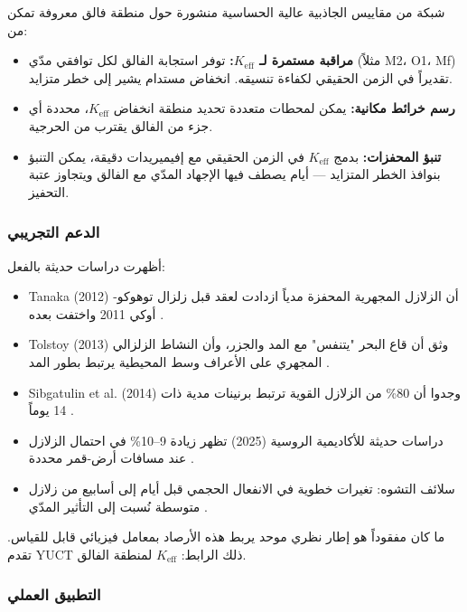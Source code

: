 \documentclass[12pt,a4paper]{article}
\theoremstyle{remark}
\begin{document}
	شبكة من مقاييس الجاذبية عالية الحساسية منشورة حول منطقة فالق معروفة تمكن من:
	
	\begin{itemize}
		\item \textbf{مراقبة مستمرة لـ \(K_{\mathrm{eff}}\):} توفر استجابة الفالق لكل توافقي مدّي (مثلاً M2، O1، Mf) تقديراً في الزمن الحقيقي لكفاءة تنسيقه. انخفاض مستدام يشير إلى خطر متزايد.
		\item \textbf{رسم خرائط مكانية:} يمكن لمحطات متعددة تحديد منطقة انخفاض \(K_{\mathrm{eff}}\)، محددة أي جزء من الفالق يقترب من الحرجية.
		\item \textbf{تنبؤ المحفزات:} بدمج \(K_{\mathrm{eff}}\) في الزمن الحقيقي مع إفيميريدات دقيقة، يمكن التنبؤ بنوافذ الخطر المتزايد — أيام يصطف فيها الإجهاد المدّي مع الفالق ويتجاوز عتبة التحفيز.
	\end{itemize}
	
	\subsubsection{الدعم التجريبي}
	
	أظهرت دراسات حديثة بالفعل:
	
	\begin{itemize}
		\item Tanaka (2012) أن الزلازل المجهرية المحفزة مدياً ازدادت لعقد قبل زلزال توهوكو-أوكي 2011 واختفت بعده \cite{Tanaka2012}.
		\item Tolstoy (2013) وثق أن قاع البحر "يتنفس" مع المد والجزر، وأن النشاط الزلزالي المجهري على الأعراف وسط المحيطية يرتبط بطور المد \cite{Tolstoy2013}.
		\item Sibgatulin et al. (2014) وجدوا أن 80\% من الزلازل القوية ترتبط برنينات مدية ذات 14 يوماً \cite{Sibgatulin2014}.
		\item دراسات حديثة للأكاديمية الروسية (2025) تظهر زيادة 9–10\% في احتمال الزلازل عند مسافات أرض-قمر محددة \cite{RAN2025}.
		\item سلائف التشوه: تغيرات خطوية في الانفعال الحجمي قبل أيام إلى أسابيع من زلازل متوسطة نُسبت إلى التأثير المدّي \cite{DeformationPrecursors2024}.
	\end{itemize}
	
	ما كان مفقوداً هو إطار نظري موحد يربط هذه الأرصاد بمعامل فيزيائي قابل للقياس. تقدم YUCT ذلك الرابط: \(K_{\mathrm{eff}}\) لمنطقة الفالق.
	
	\subsubsection{التطبيق العملي}
	
\end{document}

